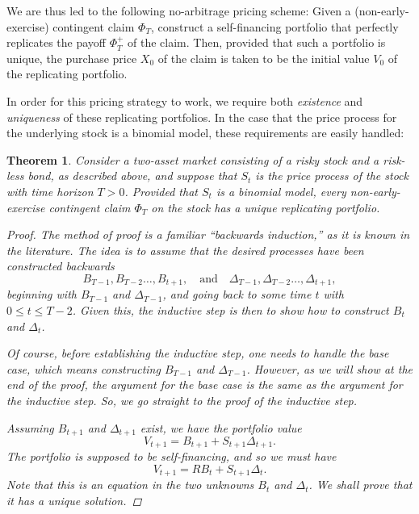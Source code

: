 \documentclass[reqno]{amsart}
\newtheorem{thm}{Theorem}[section]
\theoremstyle{definition}
\numberwithin{equation}{section}
\begin{document}
We are thus led to the following no-arbitrage pricing scheme: Given a (non-early-exercise) contingent claim $\Phi_T$, construct a self-financing portfolio that perfectly replicates the payoff $\Phi_T^+$ of the claim. Then, provided that such a portfolio is unique, the purchase price $X_0$ of the claim is taken to be the initial value $V_0$ of the replicating portfolio.

In order for this pricing strategy to work, we require both \textit{existence} and \textit{uniqueness} of these replicating portfolios. In the case that the price process for the underlying stock is a binomial model, these requirements are easily handled:

\begin{thm}
Consider a two-asset market consisting of a risky stock and a risk-less bond, as described above, and suppose that $S_t$ is the price process of the stock with time horizon $T>0$. Provided that $S_t$ is a binomial model, every non-early-exercise contingent claim $\Phi_T$ on the stock has a unique replicating portfolio.

\begin{proof}
The method of proof is a familiar ``backwards induction,'' as it is known in the literature. The idea is to assume that the desired processes have been constructed backwards
	\[
	B_{T-1},B_{T-2} \ldots, B_{t+1}, \quad \text{and} \quad \Delta_{T-1},\Delta_{T-2} \ldots, \Delta_{t+1},
	\]
beginning with $B_{T-1}$ and $\Delta_{T-1}$, and going back to some time $t$ with $0 \leq t \leq T-2$. Given this, the inductive step is then to show how to construct $B_t$ and $\Delta_t$.

Of course, before establishing the inductive step, one needs to handle the base case, which means constructing $B_{T-1}$ and $\Delta_{T-1}$. However, as we will show at the end of the proof, the argument for the base case is the same as the argument for the inductive step. So, we go straight to the proof of the inductive step.

Assuming $B_{t+1}$ and $\Delta_{t+1}$ exist, we have the portfolio value
	\[
	V_{t+1} = B_{t+1} + S_{t+1}\Delta_{t+1}.
	\]
The portfolio is supposed to be self-financing, and so we must have
	\begin{equation}\label{eq:self-financing}
	V_{t+1} = R B_t + S_{t+1}\Delta_t.
	\end{equation}
Note that this is an equation in the two unknowns $B_t$ and $\Delta_t$. We shall prove that it has a unique solution.


\end{proof}
\end{thm}
\end{document}
